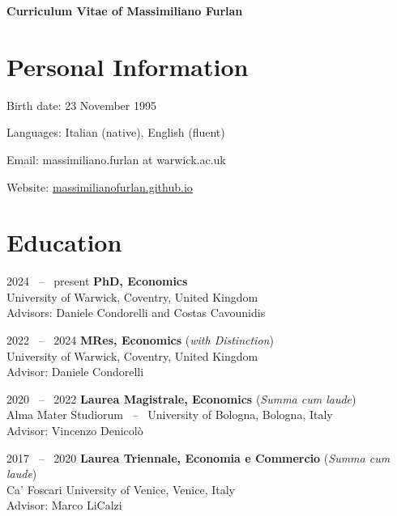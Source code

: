 \documentclass[11pt,a4paper]{article}
\begin{document}
\date{}
\thispagestyle{empty}

\begin{flushleft}
    {\LARGE \textbf{Curriculum Vitae of Massimiliano Furlan}}
\end{flushleft}

\section{Personal Information}

\begin{cvenumerate}
    \item[Birth date:] 23 November 1995
    \item[Languages:] Italian (native), English (fluent)
    \item[Email:] massimiliano.furlan at warwick.ac.uk
    \item[Website:] \href{https://massimilianofurlan.github.io}{massimilianofurlan.github.io}
\end{cvenumerate}

\section{Education}

\begin{cvenumerate}
    \item[2024 \ -- \ present] \textbf{PhD, Economics}\\
        University of Warwick, Coventry, United Kingdom\\
        Advisors: Daniele Condorelli and Costas Cavounidis
    \item[2022 \ -- \ 2024] \textbf{MRes, Economics} (\textit{with Distinction})\\
        University of Warwick, Coventry, United Kingdom\\
        Advisor: Daniele Condorelli
    \item[2020 \ -- \ 2022] \textbf{Laurea Magistrale, Economics} (\textit{Summa cum laude})\\
        Alma Mater Studiorum \ -- \ University of Bologna, Bologna, Italy\\
        Advisor: Vincenzo Denicolò
    \item[2017 \ -- \ 2020] \textbf{Laurea Triennale, Economia e Commercio} (\textit{Summa cum laude})\\
        Ca' Foscari University of Venice, Venice, Italy\\
        Advisor: Marco LiCalzi
\end{cvenumerate}
\end{document}
